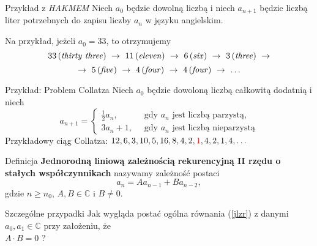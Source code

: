 \documentclass[a4paper,10pt]{beamer}
\begin{document}
\begin{frame}
	
	\begin{exampleblock}{Przykład z {\it HAKMEM}}
		Niech $a_0$ będzie dowolną liczbą i niech $a_{n+1}$ będzie liczbą liter potrzebnych do zapisu liczby $a_n$ w języku angielskim.
		
		Na przykład, jeżeli $a_0=33$, to otrzymujemy
		$$33\, ({\it thirty\ three})\ \to \ 11\, ({\it eleven})\ \to \ 6\, ({\it six})\ \to \ 3\, ({\it three})\ \to$$
		$$\to \ 5\, ({\it five})\ \to \ 4\, ({\it four})\ \to \ 4\, ({\it four})\ \to\ \ldots$$
	\end{exampleblock}

	\begin{exampleblock}{Przykład: Problem Collatza}
		Niech $a_0$ będzie dowoloną liczbą całkowitą dodatnią i niech
		$$\displaystyle a_{n+1}=\left\{\begin{array}{ll}\frac12a_n,&\ \mbox{ gdy $a_n$ jest liczbą parzystą,}\\3a_n+1,&\ \mbox{ gdy $a_n$ jest liczbą nieparzystą}\end{array}\right.$$
		Przykładowy ciąg Collatza: $12,6,3,10,5,16,8,4,2,\textcolor{red}1,4,2,1,4,\ldots$
	\end{exampleblock}
	
\end{frame}


\begin{frame}
	
	\begin{block}{Definicja}
		{\bf Jednorodną liniową zależnością rekurencyjną II rzędu o stałych współczynnikach} nazywamy zależność postaci
		\begin{equation}\label{jlzr}
			a_n=Aa_{n-1}+Ba_{n-2},
		\end{equation}
	gdzie $n\geq n_0$, $A,B\in\mathbb{C}$ i $B\neq0$.
	\end{block}

\bigskip

\begin{exampleblock}{Szczególne przypadki}
Jak wygląda postać ogólna równania (\ref{jlzr}) z danymi $a_0,a_1\in\mathbb{C}$ przy założeniu, że\\ $A\cdot B=0$ ?
\end{exampleblock}

	
\end{frame}
\end{document}
